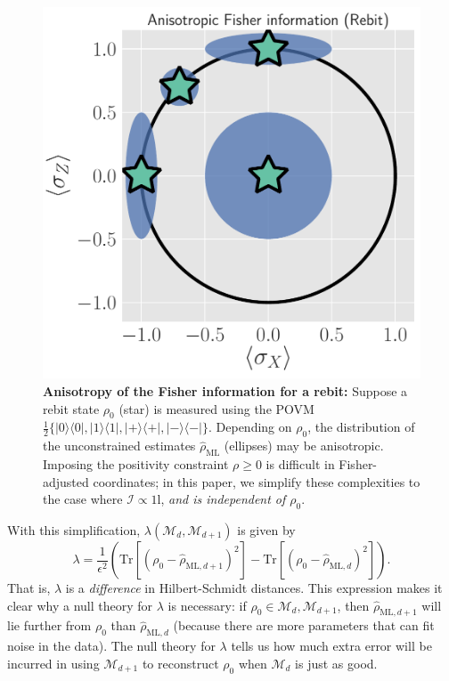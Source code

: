 \documentclass[aps,pra, twocolumn]{revtex4-1}
\newcommand{\M}{\mathcal{M}}
\newcommand{\Id}{\mathbb{I}}
\def\Id{1\!\mathrm{l}}
\newcommand{\rhohat}{\hat{\rho}}
\newcommand{\rhoML}[1]{\rhohat_{\scriptscriptstyle{\mathrm{ML},#1}}}
\begin{document}
\begin{figure}
\centering
\includegraphics[width=.75\columnwidth]{Images/Figure_5.pdf}
 \caption{\textbf{Anisotropy of the Fisher information for a rebit:} Suppose a rebit state $\rho_{0}$ (star) is measured using the POVM $\frac{1}{2}\{|0\rangle\langle 0|, |1\rangle\langle 1|, |+\rangle\langle +|, |-\rangle\langle -|\}$. Depending on $\rho_{0}$, the distribution of the unconstrained estimates $\hat{\rho}_{\mathrm{ML}}$ (ellipses) may be anisotropic. Imposing the positivity constraint $\rho \geq 0$ is difficult in Fisher-adjusted coordinates; in this paper, we simplify these complexities to the case where $\mathcal{I} \propto \Id$, \emph{and is independent of $\rho_{0}$}.}
\label{fig:anisofi}
\end{figure}

With this simplification, $\lambda(\M_{d},\M_{d+1})$ is given by
\begin{equation}
\label{eq:llrs_split}
\lambda = \frac{1}{\epsilon^{2}}\left(\mathrm{Tr}[(\rho_{0} - \rhoML{d+1})^{2}] -  \mathrm{Tr}[(\rho_{0} - \rhoML{d})^{2}]\right).
\end{equation}
That is, $\lambda$ is a \emph{difference} in Hilbert-Schmidt distances. This expression makes it clear why a null theory for $\lambda$ is necessary: if $\rho_{0} \in \M_{d},\M_{d+1}$, then $\rhoML{d+1}$ will lie further from $\rho_{0}$ than $\rhoML{d}$ (because there are more parameters that can fit noise in the data). The null theory for $\lambda$ tells us how much extra error will be incurred in using $\M_{d+1}$ to reconstruct $\rho_{0}$ when $\M_{d}$ is just as good.
\end{document}
